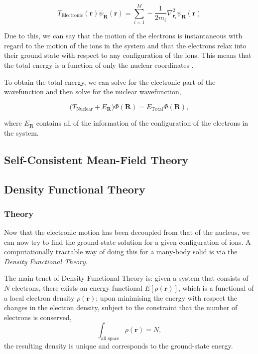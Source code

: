 \documentclass[11pt]{article}
\begin{document}
\[T_{\text{Electronic}}(\mathbf{r}) \psi_{\mathbf{R}}(\mathbf{r}) = \sum_{i =
1}^{M} - \frac{1}{2m_{i}} \nabla^{2}_{\mathbf{r}_{i}}
\psi_{\mathbf{R}}(\mathbf{r}) \]

Due to this, we can say that the motion of the electrons is instantaneous with regard to the
motion of the ions in the system and that the electrons relax into their ground state with
respect to any configuration of the ions. This means that the total energy is a function of
only the nuclear coordinates \cite{Finnis1997}. 

To obtain the total energy, we can solve for the electronic part of the wavefunction and then
solve for the nuclear wavefunction,

\[ \Big( T_{\text{Nuclear}} + E_{\mathbf{R}} \Big) \Phi(\mathbf{R}) = E_{\text{Total}} \Phi(\mathbf{R}),\]

where \(E_{\mathbf{R}}\) contains all of the information of the configuration of the electrons in
the system. 

\subsection{Self-Consistent Mean-Field Theory}
\label{sec:org0c54aa8}

\subsection{Density Functional Theory}
\label{sec:orgf3dccb3}

\subsubsection{Theory}
\label{sec:org380e90e}

Now that the electronic motion has been decoupled from that of the nucleus, we can now try to
find the ground-state solution for a given configuration of ions. A computationally tractable
way of doing this for a many-body solid is via the \emph{Density Functional Theory}. 

The main tenet of Density Functional Theory is: given a system that consists of \(N\) electrons,
there exists an energy functional \(E[\rho(\mathbf{r})]\), which is a functional of a local
electron density \(\rho(\mathbf{r})\); upon minimising the energy with respect the changes in the
electron density, subject to the constraint that the number of electrons is conserved, \[
\int_{\text{all space}} \rho(\mathbf{r}) = N, \] the resulting density is unique and
corresponds to the ground-state energy.
\end{document}
